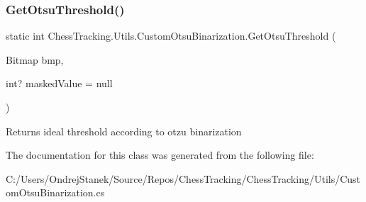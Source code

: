 \subsubsection{\texorpdfstring{GetOtsuThreshold()}{GetOtsuThreshold()}}
{\footnotesize\ttfamily static int Chess\+Tracking.\+Utils.\+Custom\+Otsu\+Binarization.\+Get\+Otsu\+Threshold (\begin{DoxyParamCaption}\item[{Bitmap}]{bmp,  }\item[{int?}]{masked\+Value = {\ttfamily null} }\end{DoxyParamCaption})\hspace{0.3cm}{\ttfamily [static]}}



Returns ideal threshold according to otzu binarization 



The documentation for this class was generated from the following file\+:\begin{DoxyCompactItemize}
\item 
C\+:/\+Users/\+Ondrej\+Stanek/\+Source/\+Repos/\+Chess\+Tracking/\+Chess\+Tracking/\+Utils/Custom\+Otsu\+Binarization.\+cs\end{DoxyCompactItemize}
